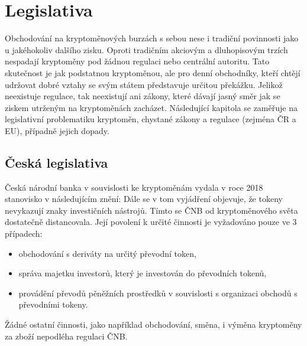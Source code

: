 \chapter{Legislativa}
\label{sec:Legislation}
Obchodování na kryptoměnových burzách s sebou nese i tradiční povinnosti jako u jakéhokoliv dalšího zisku. Oproti tradičním akciovým a dluhopisovým trzích nespadají kryptoměny pod žádnou
regulaci nebo centrální autoritu. Tato skutečnost je jak podstatnou kryptoměnou, ale pro denní obchodníky, kteří chtějí udržovat dobré vztahy se svým státem představuje určitou překážku.
Jelikož neexistuje regulace, tak neexistují ani zákony, které dávají jasný směr jak se ziskem utrženým na kryptoměnách zacházet. Následující kapitola se zaměřuje na legislativní problematiku
kryptoměn, chystané zákony a regulace (zejména ČR a EU), případně jejich dopady.


\section*{Česká legislativa}
Česká národní banka v souvislosti ke kryptoměnám vydala v roce 2018 stanovisko v následujícím znění:  %
Dále se v tom vyjádření objevuje, že tokeny nevykazují znaky investičních nástrojů. Tímto se ČNB od kryptoměnového světa dostatečně distancovala. Její povolení k určité činnosti
je vyžadováno pouze ve 3 případech:
\begin{itemize}
    \item obchodování s deriváty na určitý převodní token,
    \item správa majetku investorů, který je investován do převodních tokenů,
    \item provádění převodů pěněžních prostředků v souvislosti s organizaci obchodů s převodními tokeny.
\end{itemize}
Žádné ostatní činnosti, jako například obchodování, směna, i výměna kryptoměny za zboží nepodléha regulaci ČNB.

